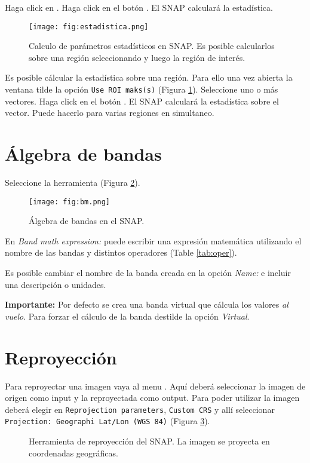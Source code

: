 Haga click en . Haga click en el botón . El SNAP calculará la estadística.

\begin{figure}[ht!]
    \centering
    \texttt{[image: fig:estadistica.png]}
    \caption{Calculo de parámetros estadísticos en SNAP. Es posible calcularlos sobre una región seleccionando  y luego la región de interés.}
    \label{fig:estadistica}
\end{figure}


Es posible cálcular la estadística sobre una región. Para ello una vez abierta la ventana tilde la opción \texttt{Use ROI maks(s)} (Figura \ref{fig:estadistica}). Seleccione uno o más vectores. Haga click en el botón . El SNAP calculará la estadística sobre el vector. Puede hacerlo para varias regiones en simultaneo.

\section{Álgebra de bandas}

 Seleccione la herramienta  (Figura \ref{fig:bm}).

 \begin{figure}[h!]
     \centering
     \texttt{[image: fig:bm.png]}
     \caption{Álgebra de bandas en el SNAP.}
     \label{fig:bm}
 \end{figure}

 En \emph{Band math expression:} puede escribir una expresión matemática utilizando el nombre de las bandas y distintos operadores (Table \ref{tab:oper}).

 Es posible cambiar el nombre de la banda creada en la opción \emph{Name:} e incluir una descripción o unidades.

 {\bf Importante:} Por defecto se crea una banda virtual que cálcula los valores \emph{al vuelo}. Para forzar el cálculo de la banda destilde la opción \emph{Virtual}.

 \section{Reproyección}

 Para reproyectar una imagen vaya al menu . Aquí deberá seleccionar la imagen de origen como input y la reproyectada como output. Para poder utilizar la imagen deberá elegir en \texttt{Reprojection parameters}, \texttt{Custom CRS} y allí seleccionar \texttt{Projection: Geographi Lat/Lon (WGS 84)} (Figura \ref{fig:reproj}).

 \begin{figure}[h!]
     \centering
     \hspace{1cm}
     \caption{Herramienta de reproyección del SNAP. La imagen se proyecta en coordenadas geográficas.}
     \label{fig:reproj}
 \end{figure}
